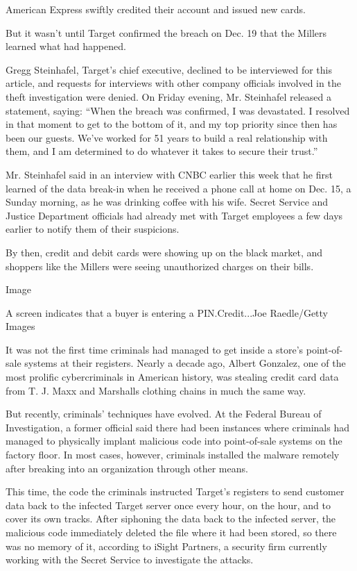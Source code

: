 American Express swiftly credited their account and issued new cards.

But it wasn't until Target confirmed the breach on Dec. 19 that the
Millers learned what had happened.

Gregg Steinhafel, Target's chief executive, declined to be interviewed
for this article, and requests for interviews with other company
officials involved in the theft investigation were denied. On Friday
evening, Mr. Steinhafel released a statement, saying: ``When the breach
was confirmed, I was devastated. I resolved in that moment to get to the
bottom of it, and my top priority since then has been our guests. We've
worked for 51 years to build a real relationship with them, and I am
determined to do whatever it takes to secure their trust.''

Mr. Steinhafel said in an interview with CNBC earlier this week that he
first learned of the data break-in when he received a phone call at home
on Dec. 15, a Sunday morning, as he was drinking coffee with his wife.
Secret Service and Justice Department officials had already met with
Target employees a few days earlier to notify them of their suspicions.

By then, credit and debit cards were showing up on the black market, and
shoppers like the Millers were seeing unauthorized charges on their
bills.

Image

A screen indicates that a buyer is entering a PIN.Credit...Joe
Raedle/Getty Images

It was not the first time criminals had managed to get inside a store's
point-of-sale systems at their registers. Nearly a decade ago, Albert
Gonzalez, one of the most prolific cybercriminals in American history,
was stealing credit card data from T. J. Maxx and Marshalls clothing
chains in much the same way.

But recently, criminals' techniques have evolved. At the Federal Bureau
of Investigation, a former official said there had been instances where
criminals had managed to physically implant malicious code into
point-of-sale systems on the factory floor. In most cases, however,
criminals installed the malware remotely after breaking into an
organization through other means.

This time, the code the criminals instructed Target's registers to send
customer data back to the infected Target server once every hour, on the
hour, and to cover its own tracks. After siphoning the data back to the
infected server, the malicious code immediately deleted the file where
it had been stored, so there was no memory of it, according to iSight
Partners, a security firm currently working with the Secret Service to
investigate the attacks.

